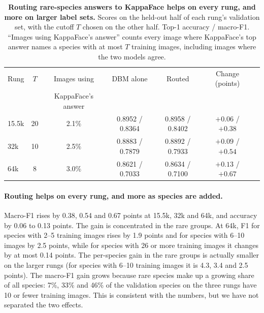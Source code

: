 \documentclass[11pt]{article}
\begin{document}
\begin{table}[t]
\centering
\small
\caption{\textbf{Routing rare-species answers to KappaFace helps on every rung, and more on
larger label sets.} Scores on the held-out half of each rung's validation set, with the
cutoff $T$ chosen on the other half. Top-1 accuracy / macro-F1. ``Images using KappaFace's
answer'' counts every image where KappaFace's top answer names a species with at most $T$
training images, including images where the two models agree.}
\label{tab:ladder-routing}
\footnotesize
\setlength{\tabcolsep}{4pt}
\begin{tabular}{@{}lcccccc@{}}
\toprule
Rung & $T$ & Images using & DBM alone & Routed & Change (points) \\
 & & KappaFace's answer & & & \\
\midrule
15.5k & 20 & 2.1\% & 0.8952 / 0.8364 & 0.8958 / 0.8402 & $+0.06$ / $+0.38$ \\
32k   & 10 & 2.5\% & 0.8883 / 0.7879 & 0.8892 / 0.7933 & $+0.09$ / $+0.54$ \\
64k   & 8  & 3.0\% & 0.8621 / 0.7033 & 0.8634 / 0.7100 & $+0.13$ / $+0.67$ \\
\bottomrule
\end{tabular}
\end{table}

\paragraph{Routing helps on every rung, and more as species are added.} Macro-F1 rises
by 0.38, 0.54 and 0.67 points at 15.5k, 32k and 64k, and accuracy by 0.06 to 0.13 points.
The gain is concentrated in the rare groups. At 64k, F1 for species with 2--5 training
images rises by 1.9 points and for species with 6--10 images by 2.5 points, while for
species with 26 or more training images it changes by at most 0.14 points. The per-species
gain in the rare groups is actually smaller on the larger rungs (for species with 6--10
training images it is 4.3, 3.4 and 2.5 points). The macro-F1 gain grows because rare
species make up a growing share of all species: 7\%, 33\% and 46\% of the validation
species on the three rungs have 10 or fewer training images. This is consistent with the
numbers, but we have not separated the two effects.
\end{document}
